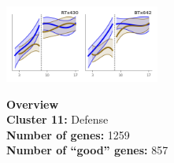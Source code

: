 \begin{multicols}{2}
\includegraphics[width=2in]{figures/clusters/leaf_Preflowering_10.png}
\columnbreak

\noindent \textbf{Overview}\\\textbf{Cluster 11:} Defense \\
\textbf{Number of genes:} 1259 \\
\textbf{Number of ``good'' genes:} 857 \\
\end{multicols}

